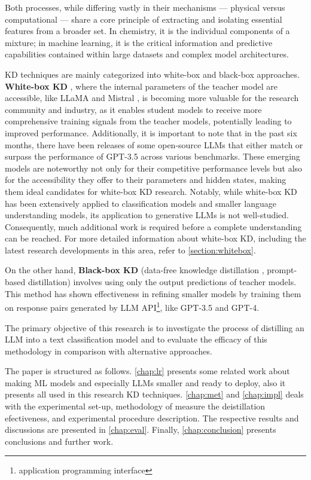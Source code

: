 Both processes, while differing vastly in their mechanisms — physical versus computational — share a core principle of extracting and isolating essential features from a broader set. In chemistry, it is the individual components of a mixture; in machine learning, it is the critical information and predictive capabilities contained within large datasets and complex model architectures.

KD techniques are mainly categorized into white-box and black-box approaches. \textbf{White-box KD} \cite{distilling}, where the internal parameters of the teacher model are accessible, like LLaMA \cite{llama,llama2} and Mistral \cite{mistral}, is becoming more valuable for the research community and industry, as it enables student models to receive more comprehensive training signals from the teacher models, potentially leading to improved performance. Additionally, it is important to note that in the past six months, there have been releases of some open-source LLMs that either match or surpass the performance of GPT-3.5 across various benchmarks. These emerging models are noteworthy not only for their competitive performance levels but also for the accessibility they offer to their parameters and hidden states, making them ideal candidates for white-box KD research. Notably, while white-box KD has been extensively applied to classification models and smaller language understanding models, its application to generative LLMs is not well-studied. Consequently, much additional work is required before a complete understanding can be reached. For more detailed information about white-box KD, including the latest research developments in this area, refer to \autoref{section:whitebox}.

On the other hand, \textbf{Black-box KD} (data-free knowledge distillation \cite{dfkd}, prompt-based distillation) involves using only the output predictions of teacher models. This method has shown effectiveness in refining smaller models by training them on response pairs generated by LLM API\footnote{application programming interface}, like GPT-3.5 and GPT-4.

The primary objective of this research is to investigate the process of distilling an LLM into a text classification model and to evaluate the efficacy of this methodology in comparison with alternative approaches.

The paper is structured as follows. \autoref{chap:lr} presents some related work about making ML models and especially LLMs smaller and ready to deploy, also it presents all used in this research KD techniques. \autoref{chap:met} and \autoref{chap:impl} deals with the experimental set-up, methodology of measure the deistillation efectiveness, and experimental procedure description. The respective results and discussions are presented in \autoref{chap:eval}. Finally, \autoref{chap:conclusion} presents conclusions and further work.

